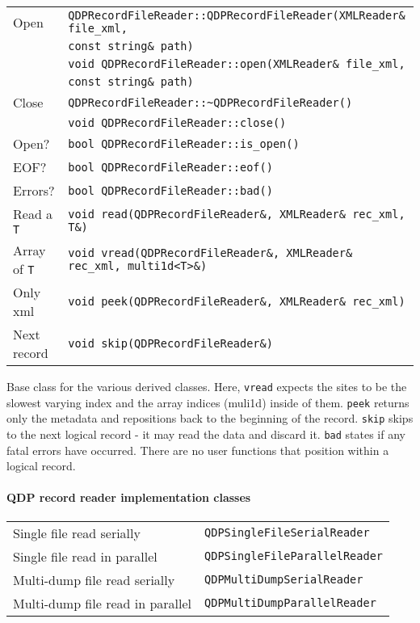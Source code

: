 \documentclass[12pt,letterpaper]{article}
\begin{document}
\begin{flushleft}
  \begin{tabular}{|l|l|}
  \hline
  Open           & \verb|QDPRecordFileReader::QDPRecordFileReader(XMLReader& file_xml, |\\
                 & \qquad\verb|const string& path)|\\
                 & \verb|void QDPRecordFileReader::open(XMLReader& file_xml, |\\
                 & \qquad\verb|const string& path)|\\
  \hline
  Close          & \verb|QDPRecordFileReader::~QDPRecordFileReader()|\\
                 & \verb|void QDPRecordFileReader::close()|\\
  \hline
  Open?          & \verb|bool QDPRecordFileReader::is_open()| \\
  \hline
  EOF?           & \verb|bool QDPRecordFileReader::eof()| \\
  \hline
  Errors?        & \verb|bool QDPRecordFileReader::bad()| \\
  \hline
  Read a \verb|T| & \verb|void read(QDPRecordFileReader&, XMLReader& rec_xml, T&)| \\
  Array of \verb|T| & \verb|void vread(QDPRecordFileReader&, XMLReader& rec_xml, multi1d<T>&)| \\
  \hline
  Only xml & \verb|void peek(QDPRecordFileReader&, XMLReader& rec_xml)| \\
  \hline
  Next record & \verb|void skip(QDPRecordFileReader&)| \\
  \hline
 \end{tabular}
\end{flushleft}
%
Base class for the various derived classes. Here, \verb|vread| expects
the sites to be the slowest varying index and the array indices
(muli1d) inside of them. \verb|peek| returns only the metadata and
repositions back to the beginning of the record.  \verb|skip| skips to
the next logical record - it may read the data and discard
it. \verb|bad| states if any fatal errors have occurred. There are no
user functions that position within a logical record.

\paragraph{QDP record reader implementation classes}

\begin{flushleft}
  \begin{tabular}{|l|l|}
  \hline
  Single file read serially & \verb|QDPSingleFileSerialReader| \\
  Single file read in parallel & \verb|QDPSingleFileParallelReader| \\
  \hline
  Multi-dump file read serially & \verb|QDPMultiDumpSerialReader| \\
  Multi-dump file read in parallel & \verb|QDPMultiDumpParallelReader| \\
  \hline
 \end{tabular}
\end{flushleft}
\end{document}
